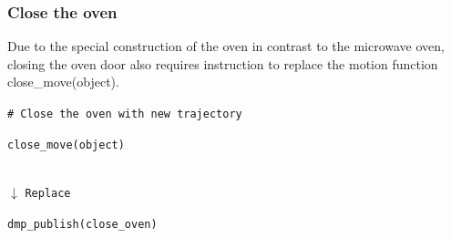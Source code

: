\documentclass[letterpaper,conference]{ieeeconf}
\begin{document}
\subsubsection{Close the oven}
Due to the special construction of the oven in contrast to the microwave oven, closing the oven door also requires instruction to replace the motion function \textquotesingle close\_move(object)\textquotesingle.
\begin{codebox}
\textcolor{codegreen}{\footnotesize \texttt{\# Close the oven with new trajectory}}\\
\colorbox{codeblue}{%
    \begin{minipage}{\dimexpr\textwidth-6pt\relax}
        \footnotesize \texttt{close\_move(object)}
    \end{minipage}%
}\\
\hspace*{2cm}$\downarrow$ \texttt{Replace}\\
\colorbox{dmpcolor}{%
    \begin{minipage}{\dimexpr\textwidth-6pt\relax}
        \footnotesize \texttt{dmp\_publish(close\_oven)}
    \end{minipage}%
}
\end{codebox}
\vspace{-1.5mm}
\end{document}
